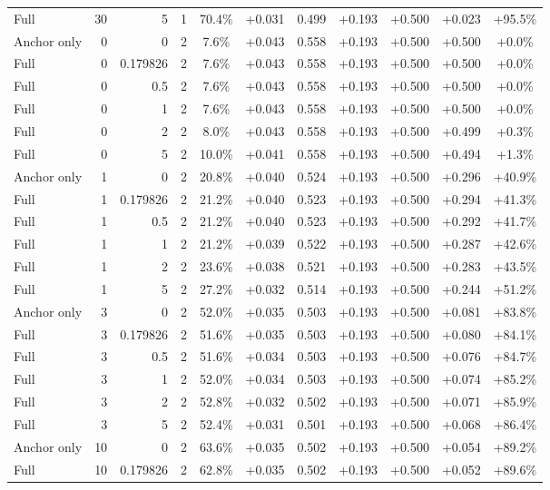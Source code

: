 \begin{table}[htbp]
\begin{tabular}{lrrrccccccc}
Full & 30 & 5 & 1 & 70.4\% & +0.031 & 0.499 & +0.193 & +0.500 & +0.023 & +95.5\% \\
Anchor only & 0 & 0 & 2 & 7.6\% & +0.043 & 0.558 & +0.193 & +0.500 & +0.500 & +0.0\% \\
Full & 0 & 0.179826 & 2 & 7.6\% & +0.043 & 0.558 & +0.193 & +0.500 & +0.500 & +0.0\% \\
Full & 0 & 0.5 & 2 & 7.6\% & +0.043 & 0.558 & +0.193 & +0.500 & +0.500 & +0.0\% \\
Full & 0 & 1 & 2 & 7.6\% & +0.043 & 0.558 & +0.193 & +0.500 & +0.500 & +0.0\% \\
Full & 0 & 2 & 2 & 8.0\% & +0.043 & 0.558 & +0.193 & +0.500 & +0.499 & +0.3\% \\
Full & 0 & 5 & 2 & 10.0\% & +0.041 & 0.558 & +0.193 & +0.500 & +0.494 & +1.3\% \\
Anchor only & 1 & 0 & 2 & 20.8\% & +0.040 & 0.524 & +0.193 & +0.500 & +0.296 & +40.9\% \\
Full & 1 & 0.179826 & 2 & 21.2\% & +0.040 & 0.523 & +0.193 & +0.500 & +0.294 & +41.3\% \\
Full & 1 & 0.5 & 2 & 21.2\% & +0.040 & 0.523 & +0.193 & +0.500 & +0.292 & +41.7\% \\
Full & 1 & 1 & 2 & 21.2\% & +0.039 & 0.522 & +0.193 & +0.500 & +0.287 & +42.6\% \\
Full & 1 & 2 & 2 & 23.6\% & +0.038 & 0.521 & +0.193 & +0.500 & +0.283 & +43.5\% \\
Full & 1 & 5 & 2 & 27.2\% & +0.032 & 0.514 & +0.193 & +0.500 & +0.244 & +51.2\% \\
Anchor only & 3 & 0 & 2 & 52.0\% & +0.035 & 0.503 & +0.193 & +0.500 & +0.081 & +83.8\% \\
Full & 3 & 0.179826 & 2 & 51.6\% & +0.035 & 0.503 & +0.193 & +0.500 & +0.080 & +84.1\% \\
Full & 3 & 0.5 & 2 & 51.6\% & +0.034 & 0.503 & +0.193 & +0.500 & +0.076 & +84.7\% \\
Full & 3 & 1 & 2 & 52.0\% & +0.034 & 0.503 & +0.193 & +0.500 & +0.074 & +85.2\% \\
Full & 3 & 2 & 2 & 52.8\% & +0.032 & 0.502 & +0.193 & +0.500 & +0.071 & +85.9\% \\
Full & 3 & 5 & 2 & 52.4\% & +0.031 & 0.501 & +0.193 & +0.500 & +0.068 & +86.4\% \\
Anchor only & 10 & 0 & 2 & 63.6\% & +0.035 & 0.502 & +0.193 & +0.500 & +0.054 & +89.2\% \\
Full & 10 & 0.179826 & 2 & 62.8\% & +0.035 & 0.502 & +0.193 & +0.500 & +0.052 & +89.6\% \\

\end{tabular}
\end{table}
